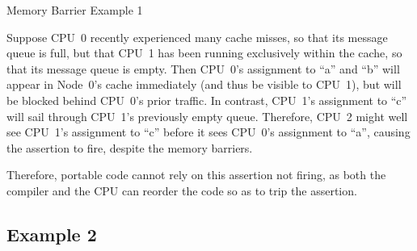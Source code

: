 \begin{listing}
\scriptsize
{}
\caption{Memory Barrier Example 1}
\label{lst:app:whymb:Memory Barrier Example 1}
\end{listing}

Suppose CPU~0 recently experienced many cache misses, so that its
message queue is full, but that CPU~1 has been running exclusively within
the cache, so that its message queue is empty.
Then CPU~0's assignment to ``a'' and ``b'' will appear in Node~0's cache
immediately (and thus be visible to CPU~1), but will be blocked behind
CPU~0's prior traffic.
In contrast, CPU~1's assignment to ``c'' will sail through CPU~1's
previously empty queue.
Therefore, CPU~2 might well see CPU~1's assignment to ``c'' before
it sees CPU~0's assignment to ``a'', causing the assertion to fire,
despite the memory barriers.

Therefore, portable code cannot rely on this assertion not firing,
as both the compiler and the CPU can reorder the code so as to trip
the assertion.

\QuickQuizEnd

\subsection{Example 2}
\label{sec:app:whymb:Example 2}

